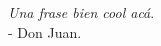 \cleardoublepage
    \vspace*{3cm}
    \begin{flushright}
        \textit{Una frase bien cool acá}. \\
        - Don Juan.
    \end{flushright}
\cleardoublepage